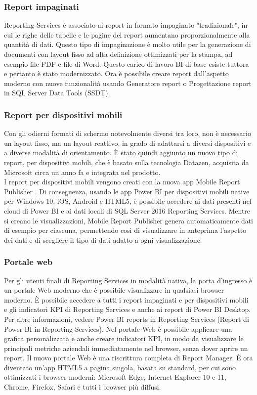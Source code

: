 \documentclass[12pt, a4paper, oneside]{book}
\begin{document}
\subsubsection{Report impaginati}
Reporting Services è associato ai report in formato impaginato "tradizionale", in cui le righe delle tabelle e le pagine del report aumentano proporzionalmente alla quantità di dati. Questo tipo di impaginazione è molto utile per la generazione di documenti con layout fisso ad alta definizione ottimizzati per la stampa, ad esempio file PDF e file di Word.
Questo carico di lavoro BI di base esiste tuttora e pertanto è stato modernizzato. Ora è possibile creare report dall'aspetto moderno con nuove funzionalità usando Generatore report o Progettazione report in SQL Server Data Tools (SSDT).
\subsubsection{Report per dispositivi mobili}
Con gli odierni formati di schermo notevolmente diversi tra loro, non è necessario un layout fisso, ma un layout reattivo, in grado di adattarsi a diversi dispositivi e a diverse modalità di orientamento. È stato quindi aggiunto un nuovo tipo di report, per dispositivi mobili, che è basato sulla tecnologia Datazen, acquisita da Microsoft circa un anno fa e integrata nel prodotto. 
\\I report per dispositivi mobili vengono creati con la nuova app Mobile Report Publisher . Di conseguenza, usando le app Power BI per dispositivi mobili native per Windows 10, iOS, Android e HTML5, è possibile accedere ai dati presenti nel cloud di Power BI e ai dati locali di SQL Server 2016 Reporting Services. Mentre si creano le visualizzazioni, Mobile Report Publisher genera automaticamente dati di esempio per ciascuna, permettendo così di visualizzare in anteprima l'aspetto dei dati e di scegliere il tipo di dati adatto a ogni visualizzazione.
\subsubsection{Portale web}
Per gli utenti finali di Reporting Services in modalità nativa, la porta d'ingresso è un portale Web moderno che è possibile visualizzare in qualsiasi browser moderno. È possibile accedere a tutti i report impaginati e per dispositivi mobili e gli indicatori KPI di Reporting Services e anche ai report di Power BI Desktop. Per altre informazioni, vedere Power BI reports in Reporting Services (Report di Power BI in Reporting Services). Nel portale Web è possibile applicare una grafica personalizzata e anche creare indicatori KPI, in modo da visualizzare le principali metriche aziendali immediatamente nel browser, senza dover aprire un report. Il nuovo portale Web è una riscrittura completa di Report Manager. È ora diventato un'app HTML5 a pagina singola, basata su standard, per cui sono ottimizzati i browser moderni: Microsoft Edge, Internet Explorer 10 e 11, Chrome, Firefox, Safari e tutti i browser più diffusi.
\end{document}

